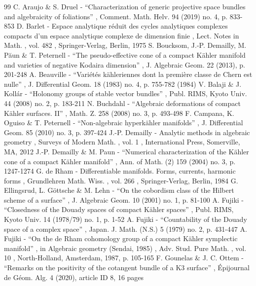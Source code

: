\documentclass[11pt]{article}
\theoremstyle{plain}
\theoremstyle{definition}
\begin{document}

\begin{thebibliography}{99}
 C. Araujo \& S. Druel - “Characterization of generic projective space bundles and algebraicity of foliations” , Comment. Math. Helv. 94 (2019) no. 4, p. 833-853
 D. Barlet - Espace analytique réduit des cycles analytiques complexes compacts d’un espace analytique complexe de dimension finie , Lect. Notes in Math. , vol. 482 , Springer-Verlag, Berlin, 1975
 S. Boucksom, J.-P. Demailly, M. Păun \& T. Peternell - “The pseudo-effective cone of a compact Kähler manifold and varieties of negative Kodaira dimension” , J. Algebraic Geom. 22 (2013), p. 201-248
 A. Beauville - “Variétés kähleriennes dont la première classe de Chern est nulle” , J. Differential Geom. 18 (1983) no. 4, p. 755-782 (1984)
 V. Balaji \& J. Kollár - “Holonomy groups of stable vector bundles” , Publ. RIMS, Kyoto Univ. 44 (2008) no. 2, p. 183-211
 N. Buchdahl - “Algebraic deformations of compact Kähler surfaces. II” , Math. Z. 258 (2008) no. 3, p. 493-498
 F. Campana, K. Oguiso \& T. Peternell - “Non-algebraic hyperkähler manifolds” , J. Differential Geom. 85 (2010) no. 3, p. 397-424
 J.-P. Demailly - Analytic methods in algebraic geometry , Surveys of Modern Math. , vol. 1 , International Press, Somerville, MA, 2012
 J.-P. Demailly \& M. Paun - “Numerical characterization of the Kähler cone of a compact Kähler manifold” , Ann. of Math. (2) 159 (2004) no. 3, p. 1247-1274
 G. de Rham - Differentiable manifolds. Forms, currents, harmonic forms , Grundlehren Math. Wiss. , vol. 266 , Springer-Verlag, Berlin, 1984
 G. Ellingsrud, L. Göttsche \& M. Lehn - “On the cobordism class of the Hilbert scheme of a surface” , J. Algebraic Geom. 10 (2001) no. 1, p. 81-100
 A. Fujiki - “Closedness of the Douady spaces of compact Kähler spaces” , Publ. RIMS, Kyoto Univ. 14 (1978/79) no. 1, p. 1-52
 A. Fujiki - “Countability of the Douady space of a complex space” , Japan. J. Math. (N.S.) 5 (1979) no. 2, p. 431-447
 A. Fujiki - “On the de Rham cohomology group of a compact Kähler symplectic manifold” , in Algebraic geometry (Sendai, 1985) , Adv. Stud. Pure Math. , vol. 10 , North-Holland, Amsterdam, 1987, p. 105-165
 F. Gounelas \& J. C. Ottem - “Remarks on the positivity of the cotangent bundle of a K3 surface” , Épijournal de Géom. Alg. 4 (2020), article ID 8, 16 pages

\end{thebibliography}
\end{document}

